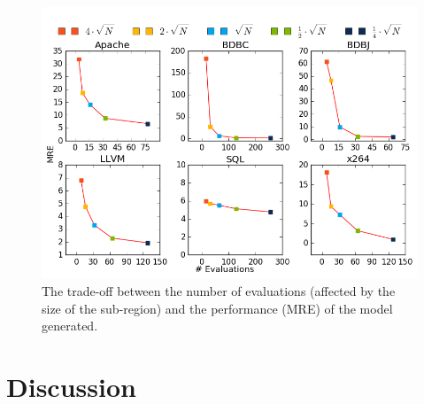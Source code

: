 \documentclass[smallextended]{svjour3}       %
\begin{document}

\begin{figure}[t]
\includegraphics[width=\columnwidth]{Figures/param_tuning}
\caption{The trade-off between the number of evaluations (affected by the size of the sub-region) and the performance (MRE) of the model generated.}
\label{fig:param_tuning}
\end{figure}


\section{Discussion}
\end{document}
